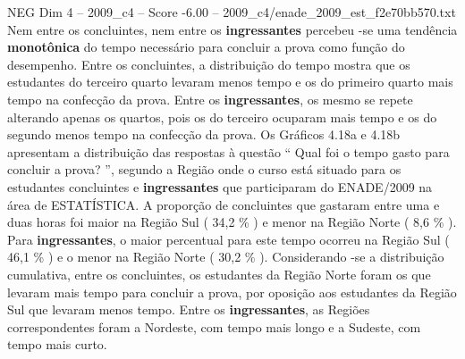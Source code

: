 \begin{textsample}{NEG Dim 4 – 2009\_c4 – Score -6.00 – 2009\_c4/enade\_2009\_est\_f2e70bb570.txt}
Nem entre os concluintes, nem entre os \textbf{ingressantes} percebeu -se uma tendência \textbf{monotônica} do tempo necessário para concluir a prova como função do desempenho.
Entre os concluintes, a distribuição do tempo mostra que os estudantes do terceiro quarto levaram menos tempo e os do primeiro quarto mais tempo na confecção da prova.
Entre os \textbf{ingressantes}, os mesmo se repete alterando apenas os quartos, pois os do terceiro ocuparam mais tempo e os do segundo menos tempo na confecção da prova.
Os Gráficos 4.18a e 4.18b apresentam a distribuição das respostas à questão “ Qual foi o tempo gasto para concluir a prova? ”, segundo a Região onde o curso está situado para os estudantes concluintes e \textbf{ingressantes} que participaram do ENADE/2009 na área de ESTATÍSTICA.
A proporção de concluintes que gastaram entre uma e duas horas foi maior na Região Sul ( 34,2 \% ) e menor na Região Norte ( 8,6 \% ).
Para \textbf{ingressantes}, o maior percentual para este tempo ocorreu na Região Sul ( 46,1 \% ) e o menor na Região Norte ( 30,2 \% ).
Considerando -se a distribuição cumulativa, entre os concluintes, os estudantes da Região Norte foram os que levaram mais tempo para concluir a prova, por oposição aos estudantes da Região Sul que levaram menos tempo.
Entre os \textbf{ingressantes}, as Regiões correspondentes foram a Nordeste, com tempo mais longo e a Sudeste, com tempo mais curto.

\end{textsample}
